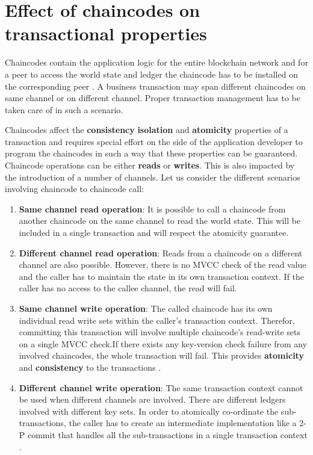 \documentclass[
  a4paper,  %
  twoside,  %
  bibliography=totoc,
  headsepline,
  cleardoublepage=empty,
  parskip=half,
  draft=false
]{scrbook}
\begin{document}
\section{Effect of chaincodes on transactional properties}
Chaincodes contain the application logic for the entire blockchain network and for a peer to access the world state and ledger the chaincode has to be installed on the corresponding peer \cite{Chaincode}. A business transaction may span different chaincodes on same channel or on different channel. Proper transaction management has to be taken care of in such a scenario.

Chaincodes affect the \textbf{consistency} \textbf{isolation} and \textbf{atomicity} properties of a transaction and requires special effort on the side of the application developer to program the chaincodes in such a way that these properties can be guaranteed. Chaincode operations can be either \textbf{reads} or \textbf{writes}. This is also impacted by the introduction of a number of channels. Let us consider the different scenarios involving chaincode to chaincode call:
\begin{enumerate}
    \item \textbf{Same channel read operation}: It is possible to call a chaincode from another chaincode on the same channel to read the world state. This will be included in a single transaction and will respect the atomicity guarantee.
    \item \textbf{Different channel read operation}: Reads from a chaincode on a different channel are also possible. However, there is no MVCC check of the read value and the caller has to maintain the state in its own transaction context. If the caller has no access to the callee channel, the read will fail.
    \item \textbf{Same channel write operation}: The called chaincode has its own individual read write sets within the caller's transaction context. Therefor, committing this transaction will involve multiple chaincode's read-write sets on a single MVCC check.If there exists any key-version check failure from any involved chaincodes, the whole transaction will fail. This provides \textbf{atomicity} and \textbf{consistency} to the transactions \cite{jira}.
    \item \textbf{Different channel write operation}: The same transaction context cannot be used when different channels are involved. There are different ledgers involved with different key sets. In order to atomically co-ordinate the sub-transactions, the caller has to create an intermediate implementation like a 2-P commit that handles all the sub-transactions in a single transaction context \cite{jira}.
\end{enumerate}
\end{document}
